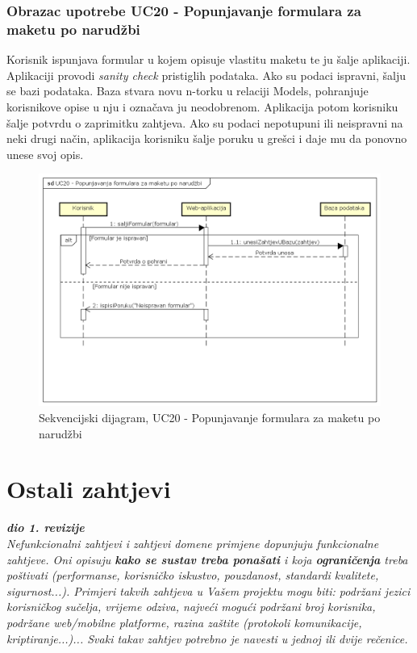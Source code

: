 				\subsubsection{Obrazac upotrebe UC20 - Popunjavanje formulara za maketu po narudžbi}
					\noindent Korisnik ispunjava formular u kojem opisuje vlastitu maketu te ju šalje aplikaciji. Aplikaciji provodi \textit{sanity check} pristiglih podataka. Ako su podaci ispravni, šalju se bazi podataka. Baza stvara novu n-torku u relaciji Models, pohranjuje korisnikove opise u nju i označava ju neodobrenom. Aplikacija potom korisniku šalje potvrdu o zaprimitku zahtjeva. Ako su podaci nepotupuni ili neispravni na neki drugi način, aplikacija korisniku šalje poruku u grešci i daje mu da ponovno unese svoj opis.
					\begin{figure}[H]
						\includegraphics[width=.9\linewidth]{dijagrami/SD_UC20.png}
						\centering
						\caption{Sekvencijski dijagram, UC20 - Popunjavanje formulara za maketu po narudžbi}
						\label{fig:sekvdija3}
					\end{figure}
				
			\eject
	
		\section{Ostali zahtjevi}
		
			\textbf{\textit{dio 1. revizije}}\\
		 
			 \textit{Nefunkcionalni zahtjevi i zahtjevi domene primjene dopunjuju funkcionalne zahtjeve. Oni opisuju \textbf{kako se sustav treba ponašati} i koja \textbf{ograničenja} treba poštivati (performanse, korisničko iskustvo, pouzdanost, standardi kvalitete, sigurnost...). Primjeri takvih zahtjeva u Vašem projektu mogu biti: podržani jezici korisničkog sučelja, vrijeme odziva, najveći mogući podržani broj korisnika, podržane web/mobilne platforme, razina zaštite (protokoli komunikacije, kriptiranje...)... Svaki takav zahtjev potrebno je navesti u jednoj ili dvije rečenice.}
			 
			 
			 
	